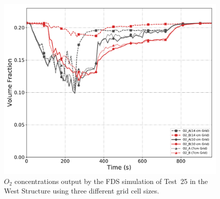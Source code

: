 \begin{figure}[!h]
	\centering
	\includegraphics[width=\columnwidth]{Figures/Plots/Grid_Sensitivity/Gas_Concentration/Test_25_O2}
	\caption[$O_2$ concentrations for West Structure simulation with different grid cell sizes.]{$O_2$ concentrations output by the FDS simulation of Test~25 in the West Structure using three different grid cell sizes.}
	\label{fig:west_O2_sensitivity}
\end{figure}

